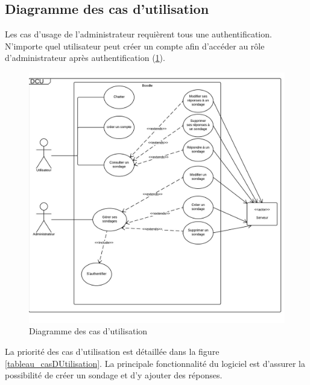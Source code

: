 \documentclass[titlepage]{report}
\begin{document}
\subsection{Diagramme des cas d'utilisation}

\par Les cas d'usage de l'administrateur requièrent tous une authentification. N'importe quel utilisateur peut créer un compte afin d'accéder au rôle d'administrateur après authentification (\ref{diagramme_casDUtilisation}).

\begin{figure}[h]
	\caption{Diagramme des cas d'utilisation}
	\label{diagramme_casDUtilisation}
	\centering
	\includegraphics[scale=0.8]{figures/diagrammes/casDUtilisation.png}
\end{figure}

\par La priorité des cas d'utilisation est détaillée dans la figure \ref{tableau_casDUtilisation}. La principale fonctionnalité du logiciel est d'assurer la possibilité de créer un sondage et d'y ajouter des réponses.
\end{document}
